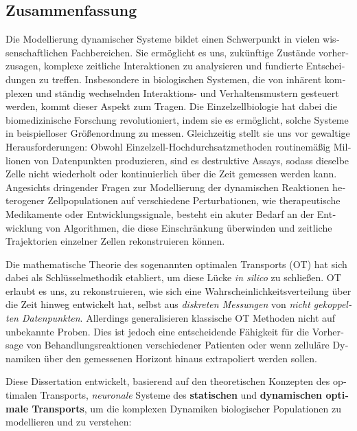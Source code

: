 \begin{otherlanguage}{ngerman}
\chapter*{Zusammenfassung}

Die Modellierung dynamischer Systeme bildet einen Schwerpunkt in vielen wissenschaftlichen Fachbereichen. Sie erm{\"o}glicht es uns, zuk{\"u}nftige Zust{\"a}nde vorherzusagen, komplexe zeitliche Interaktionen zu analysieren und fundierte Entscheidungen zu treffen. Insbesondere in biologischen Systemen, die von inh{\"a}rent komplexen und st{\"a}ndig wechselnden Interaktions- und Verhaltensmustern gesteuert werden, kommt dieser Aspekt zum Tragen.
Die Einzelzellbiologie hat dabei die biomedizinische Forschung revolutioniert, indem sie es erm{\"o}glicht, solche Systeme in beispielloser Gr{\"o}{\ss}enordnung zu messen. Gleichzeitig stellt sie uns vor gewaltige Herausforderungen: Obwohl Einzelzell-Hochdurchsatzmethoden routinem{\"a}{\ss}ig Millionen von Datenpunkten produzieren, sind es destruktive Assays, sodass dieselbe Zelle nicht wiederholt oder kontinuierlich {\"u}ber die Zeit gemessen werden kann.
Angesichts dringender Fragen zur Modellierung der dynamischen Reaktionen heterogener Zellpopulationen auf verschiedene Perturbationen, wie therapeutische Medikamente oder Entwicklungssignale, besteht ein akuter Bedarf an der Entwicklung von Algorithmen, die diese Einschr{\"a}nkung {\"u}berwinden und zeitliche Trajektorien einzelner Zellen rekonstruieren k{\"o}nnen.

Die mathematische Theorie des sogenannten optimalen Transports (OT) hat sich dabei als Schl{\"u}sselmethodik etabliert, um diese L{\"u}cke \emph{in silico} zu schlie{\ss}en. \acrshort{OT} erlaubt es uns, zu rekonstruieren, wie sich eine Wahrscheinlichkeitsverteilung {\"u}ber die Zeit hinweg entwickelt hat, selbst aus \textit{diskreten Messungen} von \textit{nicht gekoppelten Datenpunkten}. Allerdings generalisieren klassische \acrshort{OT} Methoden nicht auf unbekannte Proben. Dies ist jedoch eine entscheidende F{\"a}higkeit f{\"u}r die Vorhersage von Behandlungsreaktionen verschiedener Patienten oder wenn zellul{\"a}re Dynamiken {\"u}ber den gemessenen Horizont hinaus extrapoliert werden sollen.

Diese Dissertation entwickelt, basierend auf den theoretischen Konzepten des optimalen Transports, \textit{neuronale} Systeme des \textbf{statischen} und \textbf{dynamischen optimale Transports}, um die komplexen Dynamiken biologischer Populationen zu modellieren und zu verstehen:


\end{otherlanguage}
